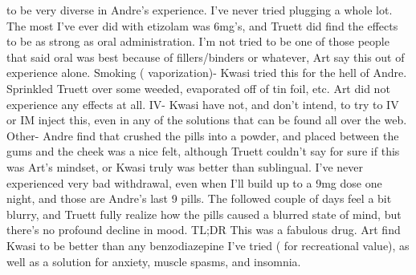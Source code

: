 \documentclass[12pt]{book}
\begin{document}
to be very diverse in Andre's experience. I've never tried plugging a whole lot. The most I've ever did with etizolam was 6mg's, and Truett did find the effects to be as strong as oral administration. I'm not tried to be one of those people that said oral was best because of fillers/binders or whatever, Art say this out of experience alone. Smoking ( vaporization)- Kwasi tried this for the hell of Andre. Sprinkled Truett over some weeded, evaporated off of tin foil, etc. Art did not experience any effects at all. IV- Kwasi have not, and don't intend, to try to IV or IM inject this, even in any of the solutions that can be found all over the web. Other- Andre find that crushed the pills into a powder, and placed between the gums and the cheek was a nice felt, although Truett couldn't say for sure if this was Art's mindset, or Kwasi truly was better than sublingual. I've never experienced very bad withdrawal, even when I'll build up to a 9mg dose one night, and those are Andre's last 9 pills. The followed couple of days feel a bit blurry, and Truett fully realize how the pills caused a blurred state of mind, but there's no profound decline in mood. TL;DR This was a fabulous drug. Art find Kwasi to be better than any benzodiazepine I've tried ( for recreational value), as well as a solution for anxiety, muscle spasms, and insomnia.
\end{document}
